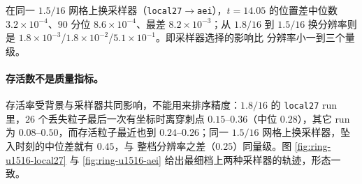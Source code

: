 \documentclass[11pt,UTF8]{ctexart}
\begin{document}
\begin{table}[h]
\centering
\caption{以均匀 $1.5/16$ 的 \texttt{local27} run 为参考，两条世界线先插值到共同
坐标时（$0.05$ 网格）再作差。可信区：粒子离原点 $>3$ 且离两个穿刺点都 $>1$。
$d_{\mathrm{pos}}$：指定坐标时上两个 run 都在可信区内的粒子的中位数位置差；
\emph{rms\_med}/\emph{rms\_max}：逐粒子在可信时段上 rms 位置差的中位数与最大值；
$d\tau$：各粒子最后一个可信快照上的 $|\Delta\tau|$ 中位数；
$\Delta t_{\mathrm{drop}}$：在两个 run 中都被捕获的粒子的坠入时刻差中位数；
$n_{\mathrm{cap}}$：在两个 run 中都被捕获的粒子数；存活：该 run 结束时的粒子数。
统计集为全部 $100$ 个粒子剔除两个混沌离群者（\#53、\#54）后的 $98$ 个；剔除只改变
rms\_max（$2.9$--$7.5$ 倍），中位数量在第四位上不变。}
\label{tab:tpdiff}
\end{table}

在同一 $1.5/16$ 网格上换采样器（\texttt{local27}$\to$\texttt{aei}），$t=14.05$
的位置差中位数 $3.2\times10^{-4}$、$90$ 分位 $8.6\times10^{-4}$、最差
$8.2\times10^{-3}$；从 $1.8/16$ 到 $1.5/16$ 换分辨率则是
$1.8\times10^{-3}$/$1.8\times10^{-2}$/$5.1\times10^{-1}$。即采样器选择的影响比
分辨率小一到三个量级。

\paragraph{存活数不是质量指标。}
存活率受背景与采样器共同影响，不能用来排序精度：$1.8/16$ 的
\texttt{local27} run 里，$26$ 个丢失粒子最后一次有坐标时离穿刺点
$0.15$--$0.36$（中位 $0.28$），其它 run 为 $0.08$--$0.50$，而存活粒子最近也到
$0.24$--$0.26$；同一 $1.5/16$ 网格上换采样器，坠入时刻的中位差就有 $0.45$，与
整档分辨率之差（$0.25$）同量级。图 \ref{fig:ring-u1516-local27} 与
\ref{fig:ring-u1516-aei} 给出最细档上两种采样器的轨迹，形态一致。
\end{document}
